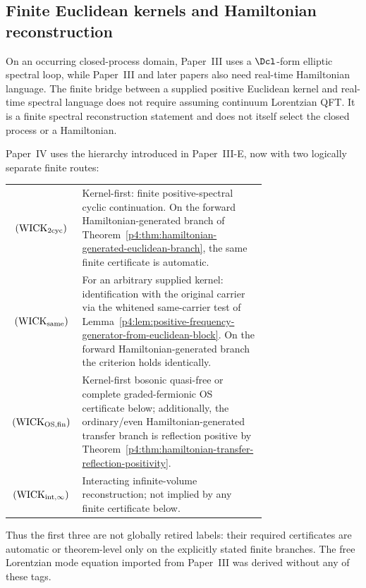 \documentclass[12pt,a4paper]{article}
\begin{document}
\subsection{Finite Euclidean kernels and Hamiltonian reconstruction}
\label{p4:sec:finite-euclidean-hamiltonian-reconstruction}

On an occurring closed-process domain, Paper~III uses a
\(\Dcl\)-form elliptic spectral loop, while Paper~III and later papers also
need real-time Hamiltonian language.  The finite bridge between a supplied
positive Euclidean kernel and real-time spectral language does not require
assuming continuum Lorentzian QFT.  It is a finite spectral reconstruction
statement and does not itself select the closed process or a Hamiltonian.

\begin{remark}
\label{p4:rem:wick-claim-ledger}
Paper~IV uses the hierarchy introduced in Paper~III-E, now with two logically
separate finite routes:
\begin{center}
\begin{tabular}{c|p{0.72\linewidth}}
\((\mathrm{WICK}_{2{\rm cyc}})\)
 & Kernel-first: finite positive-spectral cyclic continuation.  On the
 forward Hamiltonian-generated branch of
 Theorem~\ref{p4:thm:hamiltonian-generated-euclidean-branch}, the same finite
 certificate is automatic.\\
\((\mathrm{WICK}_{\rm same})\)
 & For an arbitrary supplied kernel: identification with the original carrier
 via the whitened same-carrier test of
 Lemma~\ref{p4:lem:positive-frequency-generator-from-euclidean-block}.  On
 the forward Hamiltonian-generated branch the criterion holds identically.\\
\((\mathrm{WICK}_{\rm OS,fin})\)
 & Kernel-first bosonic quasi-free or complete graded-fermionic OS
 certificate below; additionally, the ordinary/even Hamiltonian-generated
 transfer branch is reflection positive by
 Theorem~\ref{p4:thm:hamiltonian-transfer-reflection-positivity}.\\
\((\mathrm{WICK}_{\rm int,\infty})\)
 & Interacting infinite-volume reconstruction; not implied by any finite
 certificate below.
\end{tabular}
\end{center}
Thus the first three are not globally retired labels: their required
certificates are automatic or theorem-level only on the explicitly stated
finite branches.  The free Lorentzian mode equation imported from Paper~III
was derived without any of these tags.
\end{remark}
\end{document}
